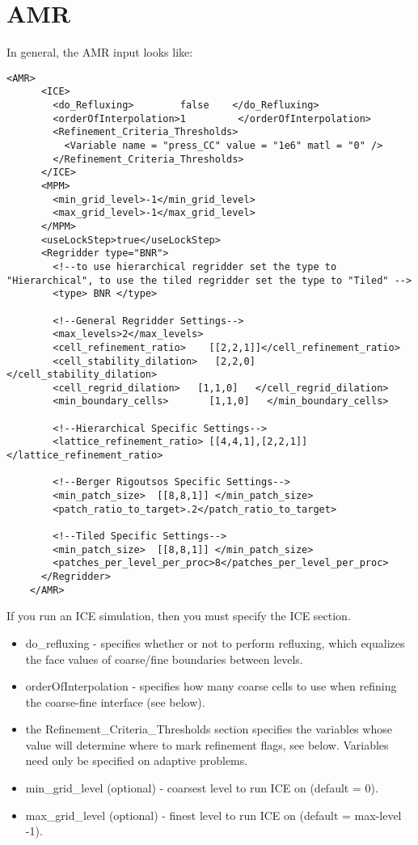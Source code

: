 \section{AMR}

In general, the AMR input looks like:

\begin{Verbatim}[fontsize=\footnotesize]
  <AMR>
      <ICE>
        <do_Refluxing>        false    </do_Refluxing>
        <orderOfInterpolation>1         </orderOfInterpolation>
        <Refinement_Criteria_Thresholds>
          <Variable name = "press_CC" value = "1e6" matl = "0" />
        </Refinement_Criteria_Thresholds>
      </ICE>
      <MPM>
        <min_grid_level>-1</min_grid_level>
        <max_grid_level>-1</max_grid_level>
      </MPM>
      <useLockStep>true</useLockStep>    
      <Regridder type="BNR">
        <!--to use hierarchical regridder set the type to "Hierarchical", to use the tiled regridder set the type to "Tiled" -->
        <type> BNR </type>

        <!--General Regridder Settings-->
        <max_levels>2</max_levels>
        <cell_refinement_ratio>    [[2,2,1]]</cell_refinement_ratio>
        <cell_stability_dilation>   [2,2,0]   </cell_stability_dilation>
        <cell_regrid_dilation>   [1,1,0]   </cell_regrid_dilation>
        <min_boundary_cells>       [1,1,0]   </min_boundary_cells>
        
        <!--Hierarchical Specific Settings-->
        <lattice_refinement_ratio> [[4,4,1],[2,2,1]]  </lattice_refinement_ratio>
        
        <!--Berger Rigoutsos Specific Settings-->
        <min_patch_size>  [[8,8,1]] </min_patch_size>
        <patch_ratio_to_target>.2</patch_ratio_to_target>

        <!--Tiled Specific Settings-->
        <min_patch_size>  [[8,8,1]] </min_patch_size>
        <patches_per_level_per_proc>8</patches_per_level_per_proc>         
      </Regridder>
    </AMR>

\end{Verbatim}

If you run an ICE simulation, then you must specify the ICE section. 

\begin{itemize}
\item do\_refluxing - specifies whether or not to perform refluxing,
  which equalizes the face values of coarse/fine boundaries between
  levels.
\item orderOfInterpolation - specifies how many coarse cells to use
  when refining the coarse-fine interface (see below).
\item the Refinement\_Criteria\_Thresholds section specifies the
  variables whose value will determine where to mark refinement flags,
  see below. Variables need only be specified on adaptive problems.
\item min\_grid\_level (optional) - coarsest level to run ICE on
  (default = 0).
\item max\_grid\_level (optional) - finest level to run ICE on (default
  = max-level -1).

\end{itemize}

